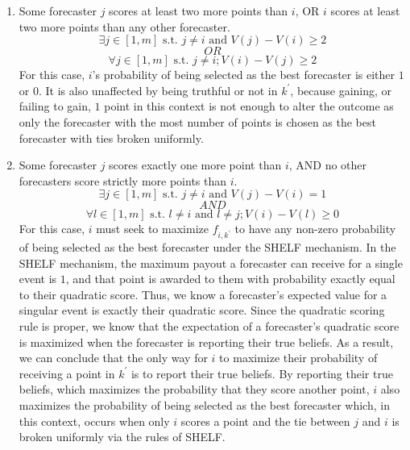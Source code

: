 \documentclass[letterpaper,12pt]{article}
\newcommand{\1}{\mathbbm{1}}
\begin{document}
\begin{enumerate}
    \item Some forecaster $j$ scores at least two more points than $i$, OR $i$ scores at least two more points than any other forecaster.\\
    $$\exists j \in [1,m] \text{ s.t. } j \ne i \text{ and } V(j) - V(i) \geq 2$$ 
    $$OR$$
    $$\forall j \in [1,m] \text{ s.t. } j \ne i; V(i) - V(j) \geq 2$$
    For this case, $i$'s probability of being selected as the best forecaster is either $1$ or $0$. It is also unaffected by being truthful or not in $k^\prime$, because gaining, or failing to gain, $1$ point in this context is not enough to alter the outcome as only the forecaster with the most number of points is chosen as the best forecaster with ties broken uniformly.
    
    \item Some forecaster $j$ scores exactly one more point than $i$, AND no other forecasters score strictly more points than $i$.\\
    $$\exists j \in [1,m] \text{ s.t. } j \neq i \text{ and } V(j) - V(i) = 1$$
    $$AND$$
    $$\forall l \in [1,m] \text{ s.t. } l \neq i \text{ and } l \neq j; V(i) - V(l) \geq 0$$
    For this case, $i$ must seek to maximize $f_{i,k^\prime}$ to have any non-zero probability of being selected as the best forecaster under the SHELF mechanism. 
    In the SHELF mechanism, the maximum payout a forecaster can receive for a single event is $1$, and that point is awarded to them with probability exactly equal to their quadratic score. Thus, we know a forecaster's expected value for a singular event is exactly their quadratic score. Since the quadratic scoring rule is proper, we know that the expectation of a forecaster's quadratic score is maximized when the forecaster is reporting their true beliefs. As a result, we can conclude that the only way for $i$ to maximize their probability of receiving a point in $k^\prime$ is to report their true beliefs. By reporting their true beliefs, which maximizes the probability that they score another point, $i$ also maximizes the probability of being selected as the best forecaster which, in this context, occurs when only $i$ scores a point and the tie between $j$ and $i$ is broken uniformly via the rules of SHELF.
    

\end{enumerate}
\end{document}
